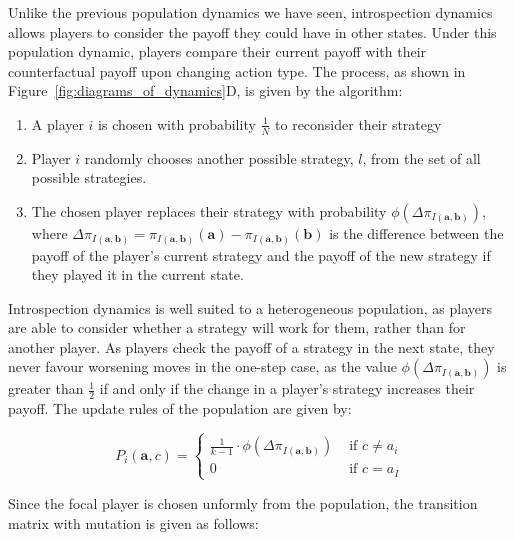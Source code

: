 \documentclass{article}
\begin{document}
Unlike the previous population dynamics we have seen, introspection
dynamics~\cite{Couto2022, Couto2023} allows players to consider the payoff they
could have in other states. Under this population dynamic, players compare their
current payoff with their counterfactual payoff upon changing action type. The
process, as shown in Figure~\ref{fig:diagrams_of_dynamics}D, is given by the
algorithm:

\begin{enumerate}
    \item A player \(i\) is chosen with probability \(\frac{1}{N}\) to
    reconsider their strategy
    \item Player \(i\) randomly chooses another possible strategy, \(l\),
    from the set of all possible strategies. 
    \item The chosen player replaces their strategy with probability \(\phi
    (\Delta \pi_{I(\mathbf{a}, \mathbf{b})})\), where \(\Delta
    \pi_{I(\mathbf{a}, \mathbf{b})} = \pi_{I(\mathbf{a},
    \mathbf{b})}(\mathbf{a})  - \pi_{I(\mathbf{a}, \mathbf{b})}(\mathbf{b})\) is
    the difference between the payoff of the player's current strategy and the
    payoff of the new strategy if they played it in the current state.
\end{enumerate}

Introspection dynamics is well suited to a heterogeneous population, as players
are able to consider whether a strategy will work for them, rather than for
another player. As players check the payoff of a strategy in the next state,
they never favour worsening moves in the one-step case, as the value \(\phi
(\Delta \pi_{I(\mathbf{a}, \mathbf{b})})\) is greater than \(\frac{1}{2}\) if
and only if the change in a player's strategy increases their payoff. The update
rules of the population are given by:

\begin{equation}
    P_i(\mathbf{a}, c) = \begin{cases}
        \frac{1}{k-1}\cdot \phi(\Delta \pi_{I(\mathbf{a}, \mathbf{b})}) & \text{ if } c \neq a_i\\
        0 & \text{ if } c = a_I
    \end{cases}
    \label{eqn:intro_update_rule}
\end{equation}

Since the focal player is chosen unformly from the population, the transition
matrix with mutation is given as follows:
\end{document}
